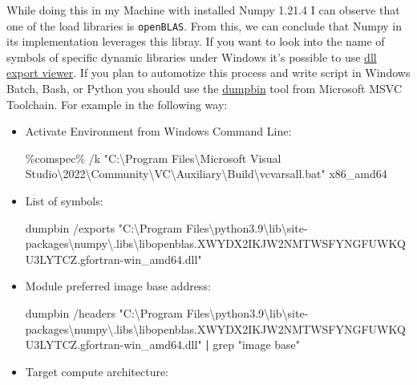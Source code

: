 \documentclass[
]{article}
\newenvironment{Shaded}{}{}
\newcommand{\ExtensionTok}[1]{#1}
\newcommand{\FunctionTok}[1]{\textcolor[rgb]{0.02,0.16,0.49}{#1}}
\newcommand{\KeywordTok}[1]{\textcolor[rgb]{0.00,0.44,0.13}{\textbf{#1}}}
\newcommand{\NormalTok}[1]{#1}
\newcommand{\StringTok}[1]{\textcolor[rgb]{0.25,0.44,0.63}{#1}}
\begin{document}
While doing this in my Machine with installed Numpy 1.21.4 I can observe
that one of the load libraries is \texttt{openBLAS}. From this, we can
conclude that Numpy in its implementation leverages this libray. If you
want to look into the name of symbols of specific dynamic libraries
under Windows it's possible to use
\href{https://www.nirsoft.net/utils/dll_export_viewer.html}{dll export
viewer}. If you plan to automotize this process and write script in
Windows Batch, Bash, or Python you should use the
\href{https://learn.microsoft.com/en-us/cpp/build/reference/dumpbin-reference?view=msvc-170}{dumpbin}
tool from Microsoft MSVC Toolchain. For example in the following way:

\begin{itemize}
\item
  Activate Environment from Windows Command Line:

\begin{Shaded}
\begin{Highlighting}[]
\ExtensionTok{\%comspec\%}\NormalTok{ /k }\StringTok{"C:\textbackslash{}Program Files\textbackslash{}Microsoft Visual Studio\textbackslash{}2022\textbackslash{}Community\textbackslash{}VC\textbackslash{}Auxiliary\textbackslash{}Build\textbackslash{}vcvarsall.bat"}\NormalTok{ x86\_amd64}
\end{Highlighting}
\end{Shaded}
\item
  List of symbols:

\begin{Shaded}
\begin{Highlighting}[]
\ExtensionTok{dumpbin}\NormalTok{ /exports }\StringTok{"C:\textbackslash{}Program Files\textbackslash{}python3.9\textbackslash{}lib\textbackslash{}site{-}packages\textbackslash{}numpy\textbackslash{}.libs\textbackslash{}libopenblas.XWYDX2IKJW2NMTWSFYNGFUWKQU3LYTCZ.gfortran{-}win\_amd64.dll"}
\end{Highlighting}
\end{Shaded}
\item
  Module preferred image base address:

\begin{Shaded}
\begin{Highlighting}[]
\ExtensionTok{dumpbin}\NormalTok{ /headers }\StringTok{"C:\textbackslash{}Program Files\textbackslash{}python3.9\textbackslash{}lib\textbackslash{}site{-}packages\textbackslash{}numpy\textbackslash{}.libs\textbackslash{}libopenblas.XWYDX2IKJW2NMTWSFYNGFUWKQU3LYTCZ.gfortran{-}win\_amd64.dll"}  \KeywordTok{|} \FunctionTok{grep} \StringTok{"image base"}
\end{Highlighting}
\end{Shaded}
\item
  Target compute architecture:


\end{itemize}
\end{document}
